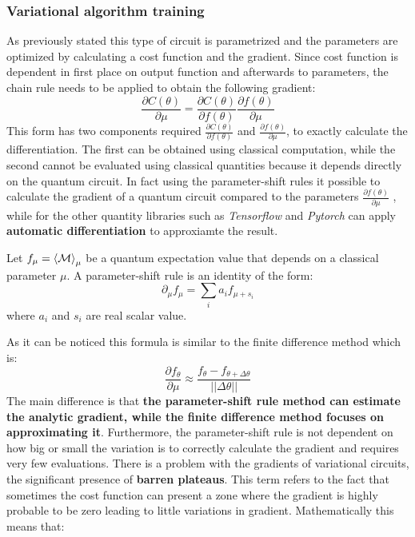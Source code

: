 \subsubsection{Variational algorithm training}
As previously stated this type of circuit is parametrized and the parameters are optimized by calculating a cost function and the gradient. Since cost function is dependent in first place on output function and afterwards to parameters, the chain rule needs to be applied to obtain the following gradient:
\begin{equation}
	\frac{\partial C(\theta)}{\partial \mu} = \frac{\partial C(\theta)}{\partial f(\theta)} \frac{\partial f(\theta)}{\partial \mu} 
\end{equation}
This form has two components required $\frac{\partial C(\theta)}{\partial f(\theta)}$ and $\frac{\partial f(\theta)}{\partial \mu}$, to exactly calculate the differentiation. The first can be obtained using classical computation, while the second cannot be evaluated using classical quantities because it depends directly on the quantum circuit.
In fact using the parameter-shift rules it possible to calculate the gradient of a quantum circuit compared to the parameters $\frac{\partial f(\theta)}{\partial \mu}$ , while for the other quantity libraries such as \textit{Tensorflow} and \textit{Pytorch} can apply \textbf{automatic differentiation} to approxiamte the result.
\begin{mydef}
	Let $f_\mu = \braket{\mathcal{M}}_\mu$ be a quantum expectation value that depends on a classical parameter $\mu$. A parameter-shift rule is an identity of the form:
	\begin{equation}
		\partial_\mu f_\mu = \sum_{i} a_i f_{\mu + s_i}
	\end{equation}
	where ${a_i}$ and ${s_i}$ are real scalar value.
\end{mydef}
As it can be noticed this formula is similar to the finite difference method which is:
\begin{equation*}
	\frac{\partial f_\theta}{\partial \mu} \approx \frac{f_\theta - f_{\theta + \Delta \theta}}{||\Delta \theta||}
\end{equation*}
The main difference is that \textbf{the parameter-shift rule method can estimate the analytic gradient, while the finite difference method focuses on approximating it}. Furthermore, the parameter-shift rule is not dependent on how big or small the variation is to correctly calculate the gradient and requires very few evaluations.
There is a problem with the gradients of variational circuits, the significant presence of \textbf{barren plateaus}. This term refers to the fact that sometimes the cost function can present a zone where the gradient is highly probable to be zero leading to little variations in gradient. Mathematically this means that:
